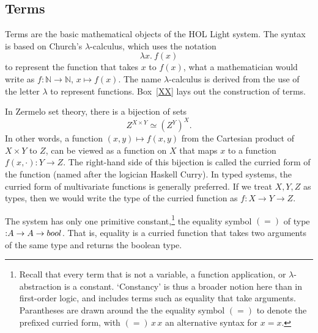 \documentclass{llncs}
\def\tc{\hbox{:}}
\newcommand{\ring}[1]{\mathbb{#1}}
\begin{document}
\subsection{Terms}

Terms are the basic mathematical objects of the HOL Light system.  The syntax is based
on Church's $\lambda$-calculus, which uses the notation
   $$
   \lambda x.\ f (x)
   $$
to represent the function that takes $x$ to $f(x)$, what a mathematician would write
as $f:\ring{N}\to\ring{N}$, $x\mapsto f(x)$.  The name $\lambda$-calculus is derived
from the use of the letter $\lambda$ to represent functions.  Box~\ref{XX} lays out
the construction of terms.



In Zermelo set theory, there is a bijection of sets
  $$
  Z^{X \times Y} \simeq (Z^Y)^X.
  $$
In other words, a function $(x,y)\mapsto f(x,y)$
from the Cartesian product of $X \times Y$ to $Z$, can be viewed as a function on
$X$ that maps $x$ to a function $f(x,\cdot):Y\to Z$.  The right-hand side of this
bijection is called the curried form of the function (named after the logician Haskell Curry).  
In typed systems, the curried form of multivariate functions is generally preferred.  If we
treat $X,Y,Z$ as types, then we would write the type of the curried function as
$f:X\to Y \to Z$.

The system has only one primitive constant,\footnote{Recall that every term that is
not a variable, a function application, or $\lambda$-abstraction is a constant.  `Constancy' is thus a broader notion here than in first-order logic, and includes terms
such as equality that take arguments.  Parantheses are drawn around the the
equality symbol $( = )$ to denote the prefixed curried form, with
$( = )\, x\, x$ an alternative syntax for $x = x$.}  
the equality symbol $( = )$
of type $\tc A\to A\to  bool$.  
That is, equality is a curried function that takes two arguments of the same type
and returns the boolean type.
\end{document}
